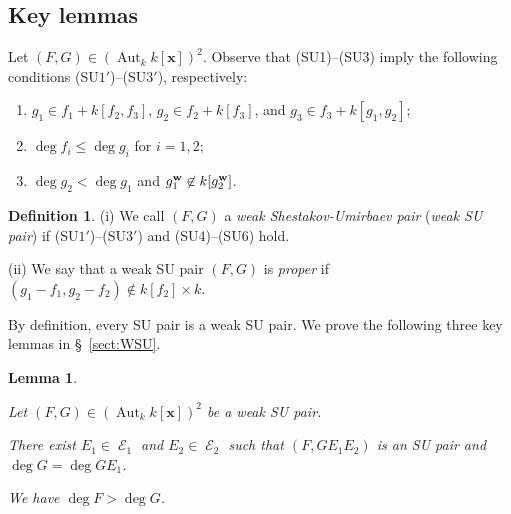 \documentclass{amsart}
\theoremstyle{plain}
\newtheorem{llem}{Lemma}
\theoremstyle{definition}
\newtheorem{definition}[thm]{Definition}
\newcommand{\E }{{\mathop{\mathcal{E}}\nolimits}}
\newcommand{\Aut }{\mathop{\mathrm{Aut}}\nolimits}
\newcommand{\nd}{\noindent}
\newcommand{\x}{{\boldsymbol x}}
\newcommand{\w}{{\bf w}}
\newcommand{\kx}{k[\x]}
\begin{document}
\subsection{Key lemmas}\label{subsect:fundamental lemmas}
Let $(F,G)\in (\Aut _k\kx )^2$. 
Observe that (SU1)--(SU3) 
imply the following conditions (SU$1'$)--(SU$3'$), 
respectively: 


\nd 
\begin{enumerate}[leftmargin=12mm]

\item [(SU$1'$)] 
$g_1\in f_1+k[f_2,f_3]$, $g_2\in f_2+k[f_3]$, 
and $g_3\in f_3+k[g_1,g_2]$; 

\item [(SU$2'$)] $\deg f_i\leq \deg g_i$ for $i=1,2$; 

\item [(SU$3'$)] $\deg g_2<\deg g_1$ 
and $g_1^{\w }\not\in k[g_2^{\w }]$. 
\end{enumerate}



\begin{definition}\label{def:wsup}\rm 
(i) 
We call $(F,G)$ 
a {\it weak Shestakov-Umirbaev pair} ({\it weak SU pair}) if 
(SU$1'$)--(SU$3'$) and (SU4)--(SU6) hold. 


\nd (ii) We say that 
a weak SU pair $(F,G)$ is {\it proper} if 
$(g_1-f_1,g_2-f_2)\not\in k[f_2]\times k$. 
\end{definition}


By definition, every SU pair is a weak SU pair. 
We prove the following three key lemmas in \S ~\ref{sect:WSU}. 


\begin{llem}\label{prop:equivalence}


Let $(F,G)\in (\Aut _k\kx )^2$ be a weak SU pair. 



\nd{\rm (i)} 
There exist 
$E_1\in \E _1$ and $E_2\in \E _2$ 
such that 
$(F,GE_1E_2)$ is an SU pair and $\deg G=\deg GE_1$. 


\nd{\rm (ii)} We have $\deg F>\deg G$. 
\end{llem}
\end{document}
